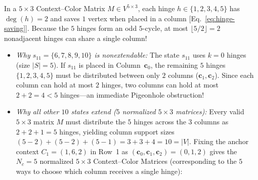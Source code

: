 \documentclass[aps,pra,reprint,superscriptaddress,longbibliography,nofootinbib,floatfix,10pt]{revtex4-2}
\theoremstyle{definition}\newtheorem{definition}[theorem]{Definition}
\theoremstyle{remark}\newtheorem{remark}[theorem]{Remark}
\begin{document}
In a $5\times 3$ Context--Color Matrix $M\in V^{5\times 3}$, each hinge $h\in\{1,2,3,4,5\}$ has $\deg(h)=2$ and saves $1$ vertex when placed in a column [Eq.~\eqref{eq:hinge-saving}]. Because the $5$ hinges form an odd $5$-cycle, at most $\lfloor 5/2\rfloor=2$ nonadjacent hinges can share a single column!
\begin{itemize}
\item \emph{Why $s_{11}=\{6,7,8,9,10\}$ is nonextendable:} The state $s_{11}$ uses $k=0$ hinges (size $|S|=5$). If $s_{11}$ is placed in Column~$\mathbf{c}_0$, the remaining $5$ hinges $\{1,2,3,4,5\}$ must be distributed between only $2$ columns ($\mathbf{c}_1,\mathbf{c}_2$). Since each column can hold at most $2$ hinges, two columns can hold at most $2+2=4<5$ hinges—an immediate Pigeonhole obstruction!
\item \emph{Why all other $10$ states extend ($5$ normalized $5\times 3$ matrices):} Every valid $5\times 3$ matrix $M$ must distribute the $5$ hinges across the $3$ columns as $2+2+1=5$ hinges, yielding column support sizes $(5-2)+(5-2)+(5-1)=3+3+4=10=|V|$.
Fixing the anchor context $C_1=(1,6,2)$ in Row~1 as $(\mathbf{c}_0,\mathbf{c}_1,\mathbf{c}_2)=(0,1,2)$ gives the $N_c=5$ normalized $5\times 3$ Context--Color Matrices (corresponding to the $5$ ways to choose which column receives a single hinge):
\end{itemize}
\end{document}
